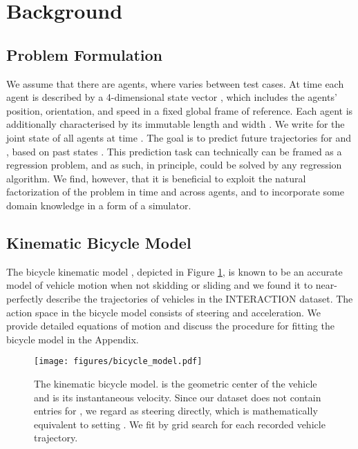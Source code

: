 \documentclass[letterpaper, 10 pt, conference]{ieeeconf}
\begin{document}
\section{Background}

\subsection{Problem Formulation}

We assume that there are  agents, where  varies between test cases. At time  each agent  is described by a 4-dimensional state vector , which includes the agents' position, orientation, and speed in a fixed global frame of reference. Each agent is additionally characterised by its immutable length  and width . We write  for the joint state of all agents at time . The goal is to predict future trajectories  for  and , based on past states . This prediction task can technically can be framed as a regression problem, and as such, in principle, could be solved by any regression algorithm.  We find, however, that it is beneficial to exploit the natural factorization of the problem in time and across agents, and to incorporate some domain knowledge in a form of a simulator.

\subsection{Kinematic Bicycle Model}

The bicycle kinematic model \cite{rajamani_lateral_2012}, depicted in Figure \ref{fig:bicycle-model}, is known to be an accurate model of vehicle motion when not skidding or sliding and we found it to near-perfectly describe the trajectories of vehicles in the INTERACTION dataset. The action space in the bicycle model consists of steering and acceleration.
We provide detailed equations of motion and discuss the procedure for fitting the bicycle model in the Appendix.

\begin{figure}[t]
    \centering
    \texttt{[image: figures/bicycle\_model.pdf]}
    \caption{\cite{polack_kinematic_2017} The kinematic bicycle model.  is the geometric center of the vehicle and  is its instantaneous velocity. Since our dataset does not contain entries for , we regard  as steering directly, which is mathematically equivalent to setting .
    We fit  by grid search for each recorded vehicle trajectory.} 
    \label{fig:bicycle-model}
\end{figure}
\end{document}
